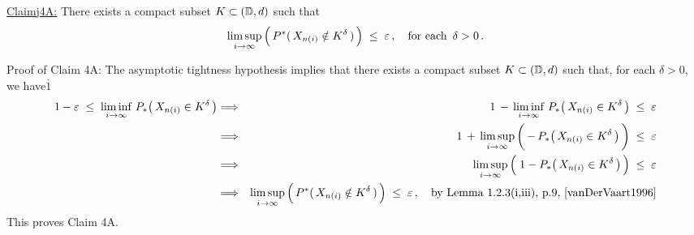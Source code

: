 \vskip 0.8cm
\begin{center}\begin{minipage}{6.5in}
\underline{Claim{{\color{white}j}}4A:}\;\;
There exists a compact subset $K \subset (\mathbb{D},d)$ such that
\begin{equation*}
\underset{i\rightarrow\infty}{\limsup}\left(\,
	P^{*}(\,X_{n(i)} \overset{{\color{white}.}}{\notin} K^{\delta}\,)
\,\right)
\;\leq\; \varepsilon\,,
\quad
\textnormal{for each \,$\delta > 0$}\,.
\end{equation*}
\end{minipage}\end{center}
Proof of Claim 4A:\;\;
The asymptotic tightness hypothesis implies that there exists
a compact subset $K \subset (\mathbb{D},d)$ such that,
for each $\delta > 0$, we have{\color{white}$\overset{.}{1}$}
\begin{eqnarray*}
1 - \varepsilon \; \leq \; \underset{i\rightarrow\infty}{\liminf}\; P_{*}\!\left(\,X_{n(i)} \in K^{\delta}\,\right)
&\Longrightarrow&
	1 \,-\, \underset{i\rightarrow\infty}{\liminf}\; P_{*}\!\left(\,X_{n(i)} \in K^{\delta}\,\right) \;\leq\; \varepsilon
\\
&\Longrightarrow&
	1 \,+\, \underset{i\rightarrow\infty}{\limsup}\left(\,
		\overset{{\color{white}1}}{-}\,P_{*}\!\left(\,X_{n(i)} \in K^{\delta}\,\right)
	\,\right)
	\;\leq\; \varepsilon
\\
&\Longrightarrow&
	\underset{i\rightarrow\infty}{\limsup}\left(\;
		1 \overset{{\color{white}.}}{-} P_{*}\!\left(\,X_{n(i)} \in K^{\delta}\,\right)
	\,\right)
	\;\leq\; \varepsilon
\\
&\Longrightarrow&
	\underset{i\rightarrow\infty}{\limsup}\left(\,
		P^{*}(\,X_{n(i)} \overset{{\color{white}.}}{\notin} K^{\delta}\,)
	\,\right)
	\;\leq\; \varepsilon\,,
	\quad
	\textnormal{by Lemma 1.2.3(i,iii), p.9, \cite{vanDerVaart1996}}
\end{eqnarray*}
This proves Claim 4A.

